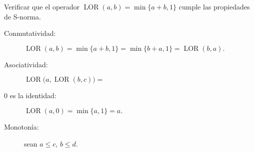 \documentclass{article}
\DeclareMathOperator{\LOR} {LOR}
\begin{document}
Verificar que el operador \(\LOR(a, b) = \min\{a + b, 1\}\)
cumple las propiedades de S-norma.
%
\begin{description}
  \item[Conmutatividad:]
    \(
      \LOR(a, b) =
      \min\{a + b, 1\} =
      \min\{b + a, 1\} =
      \LOR(b, a).
    \)
  \item[Asociatividad:]
    \(
      \LOR\bigl(a, \LOR(b, c)\bigr) =
    \)
  \item[0 es la identidad:]
    \(
      \LOR(a, 0) =
      \min\{a, 1\} =
      a.
    \)
  \item[Monotonía:] sean \(a\le c\), \(b\le d\).
\end{description}
\end{document}

